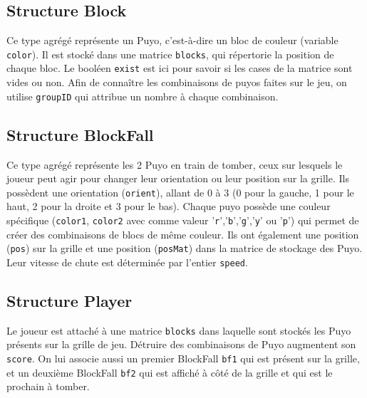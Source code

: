 \documentclass[11pt]{report}
\renewcommand{\tt}[1]{\texttt{#1}}
\begin{document}
\subsection{Structure Block}



Ce type agrégé représente un Puyo, c'est-à-dire un bloc de couleur (variable \tt{color}). Il est stocké dans une matrice \tt{blocks}, qui répertorie la position de chaque bloc. Le booléen \tt{exist} est ici pour savoir si les cases de la matrice sont vides ou non. Afin de connaître les combinaisons de puyos faites sur le jeu, on utilise \tt{groupID} qui attribue un nombre à chaque combinaison. 
\\

\subsection{Structure BlockFall}



Ce type agrégé représente les 2 Puyo en train de tomber, ceux sur lesquels le joueur peut agir pour changer leur orientation ou leur position sur la grille. Ils possèdent une orientation (\tt{orient}), allant de 0 à 3 (0 pour la gauche, 1 pour le haut, 2 pour la droite et 3 pour le bas). Chaque puyo possède une couleur spécifique (\tt{color1}, \tt{color2} avec comme valeur '\tt{r}','\tt{b}','\tt{g}','\tt{y}' ou '\tt{p}') qui permet de créer des combinaisons de blocs de même couleur. Ils ont également une position (\tt{pos}) sur la grille et une position (\tt{posMat}) dans la matrice de stockage des Puyo. Leur vitesse de chute est déterminée par l'entier \tt{speed}.  
\\

\subsection{Structure Player}



Le joueur est attaché à une matrice \tt{blocks} dans laquelle sont stockés les Puyo présents sur la grille de jeu. Détruire des combinaisons de Puyo augmentent son \tt{score}. On lui associe aussi un premier BlockFall \tt{bf1} qui est présent sur la grille, et un deuxième BlockFall \tt{bf2} qui est affiché à côté de la grille et qui est le prochain à tomber. 
\\
\end{document}
